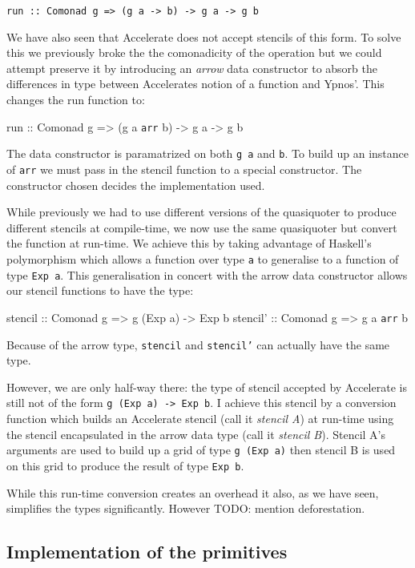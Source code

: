 \begin{verbatim}
run :: Comonad g => (g a -> b) -> g a -> g b
\end{verbatim}

We have also seen that Accelerate does not accept stencils of this form.
To solve this we previously broke the the comonadicity of the operation
but we could attempt preserve it by introducing an \emph{arrow} data
constructor to absorb the differences in type between Accelerates notion
of a function and Ypnos'. This changes the run function to:

run :: Comonad g =\textgreater{} (g a \texttt{arr} b) -\textgreater{} g
a -\textgreater{} g b

The data constructor is paramatrized on both \texttt{g a} and
\texttt{b}. To build up an instance of \texttt{arr} we must pass in the
stencil function to a special constructor. The constructor chosen
decides the implementation used.

While previously we had to use different versions of the quasiquoter to
produce different stencils at compile-time, we now use the same
quasiquoter but convert the function at run-time. We achieve this by
taking advantage of Haskell's polymorphism which allows a function over
type \texttt{a} to generalise to a function of type \texttt{Exp a}. This
generalisation in concert with the arrow data constructor allows our
stencil functions to have the type:

stencil :: Comonad g =\textgreater{} g (Exp a) -\textgreater{} Exp b
stencil' :: Comonad g =\textgreater{} g a \texttt{arr} b

Because of the arrow type, \texttt{stencil} and \texttt{stencil'} can
actually have the same type.

However, we are only half-way there: the type of stencil accepted by
Accelerate is still not of the form
\texttt{g (Exp a) -\textgreater{} Exp b}. I achieve this stencil by a
conversion function which builds an Accelerate stencil (call it
\emph{stencil A}) at run-time using the stencil encapsulated in the
arrow data type (call it \emph{stencil B}). Stencil A's arguments are
used to build up a grid of type \texttt{g (Exp a)} then stencil B is
used on this grid to produce the result of type \texttt{Exp b}.

While this run-time conversion creates an overhead it also, as we have
seen, simplifies the types significantly. However TODO: mention
deforestation.

\subsection{Implementation of the primitives}

